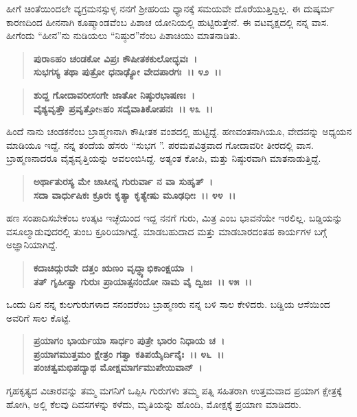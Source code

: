 ಹೀಗೆ ಚಿಂತೆಯಿಂದಲೇ ವ್ಯಗ್ರಮನಸ್ಸುಳ್ಳ ನನಗೆ ಶ‍್ರೀಹರಿಯ ಧ್ಯಾನಕ್ಕೆ ಸಮಯವೇ ದೊರೆಯುತ್ತಿದ್ದಿಲ್ಲ. ಈ ದುಷ್ಕರ್ಮ ಕಾರಣದಿಂದ ಹೀನನಾಗಿ ಕೂಷ್ಮಾಂಡವೆಂಬ ಪಿಶಾಚ ಯೋನಿಯಲ್ಲಿ ಹುಟ್ಟಿರುತ್ತೇನೆ. ಈ ವಟವೃಕ್ಷದಲ್ಲಿ ನನ್ನ ವಾಸ. ಹೀಗೆಂದು “ಹೀನ”ನು ನುಡಿಯಲು “ನಿಷ್ಠುರ”ನೆಂಬ ಪಿಶಾಚಿಯು ಮಾತನಾಡಿತು.

\begin{verse}
\textbf{ಪುರಾಽಹಂ ಚಂಡಕೋ ವಿಪ್ರಃ ಕೌಷೀತಕಕುಲೋದ್ಭವಃ~।}\\\textbf{ಸುಭಗಸ್ಯ ತಥಾ ಪುತ್ರೋ ಧನಾಢ್ಯೋ ವೇದಪಾರಗಃ~।। ೪೨~।। }
\end{verse}

\begin{verse}
\textbf{ಶುದ್ದ ಗೋದಾವರೀಸಂಗೇ ಜಾತೋ ನಿಷ್ಠುರಭಾಷಣಃ~।}\\\textbf{ವೈಶ್ಯವೃತ್ತೌ ಪ್ರವೃತ್ತೋsಹಂ ಸದೈವಾತಿಕೋಪನಃ~।। ೪೩~।।}
\end{verse}

ಹಿಂದೆ ನಾನು ಚಂಡಕನೆಂಬ ಬ್ರಾಹ್ಮಣನಾಗಿ ಕೌಷೀತಕ ವಂಶದಲ್ಲಿ ಹುಟ್ಟಿದ್ದೆ. ಹಣವಂತನಾಗಿಯೂ, ವೇದವನ್ನು ಅಧ್ಯಯನ ಮಾಡಿಯೂ ಇದ್ದೆ. ನನ್ನ ತಂದೆಯ ಹೆಸರು “ಸುಭಗ ”. ಪರಮಪವಿತ್ರವಾದ ಗೋದಾವರೀ ತೀರದಲ್ಲಿ ವಾಸ. ಬ್ರಾಹ್ಮಣನಾದರೂ ವೈಶ್ಯವೃತ್ತಿಯನ್ನು ಅವಲಂಬಿಸಿದ್ದೆ. ಅತ್ಯಂತ ಕೋಪಿ, ಮತ್ತು ನಿಷ್ಠುರವಾಗಿ ಮಾತನಾಡುತ್ತಿದ್ದೆ.

\begin{verse}
\textbf{ಅರ್ಥಾತುರಸ್ಯ ಮೇ ಚಾಸೀನ್ನ ಗುರುರ್ವಾ ನ ವಾ ಸುಹೃತ್~।}\\\textbf{ಸದಾ ವಾರ್ಧುಷಿಕಃ ಕ್ರೂರಃ ಕೃತ್ಯಾ ಕೃತ್ಯೇಷು ಮೂಢಧೀಃ~।। ೪೪~।।}
\end{verse}

ಹಣ ಸಂಪಾದಿಸಬೇಕೆಂಬ ಉತ್ಕಟ ಇಚ್ಛೆಯಿಂದ ಇದ್ದ ನನಗೆ ಗುರು, ಮಿತ್ರ ಎಂಬ ಭಾವನೆಯೇ ಇರಲಿಲ್ಲ. ಬಡ್ಡಿಯನ್ನು ವಸೂಲ್ಮಾಡುವುದರಲ್ಲಿ ತುಂಬ ಕ್ರೂರಿಯಾಗಿದ್ದೆ. ಮಾಡಬಹುದಾದ ಮತ್ತು ಮಾಡಬಾರದಂತಹ ಕಾರ್ಯಗಳ ಬಗ್ಗೆ ಅಜ್ಞಾನಿಯಾಗಿದ್ದೆ.

\begin{verse}
\textbf{ಕದಾಚಿದ್ಗುರವೇ ದತ್ತಂ ಋಣಂ ವೃದ್ಧ್ಯಾಭಿಕಾಂಕ್ಷಯಾ~।}\\\textbf{ತತ್ ಗೃಹೀತ್ವಾ ಗುರುಃ ಪ್ರಾಯಾತ್ಸನಂದೋ ನಾಮ ವೈ ದ್ವಿಜಃ~।। ೪೫~।।}
\end{verse}

ಒಂದು ದಿನ ನನ್ನ ಕುಲಗುರುಗಳಾದ ಸನಂದರೆಂಬ ಬ್ರಾಹ್ಮಣರು ನನ್ನ ಬಳಿ ಸಾಲ ಕೇಳಿದರು. ಬಡ್ಡಿಯ ಆಸೆಯಿಂದ ಅವರಿಗೆ ಸಾಲ ಕೊಟ್ಟೆ.

\begin{verse}
\textbf{ಪ್ರಯಾಗಂ ಭಾರ್ಯಯಾ ಸಾರ್ಧಂ ಪುತ್ರೇ ಭಾರಂ ನಿಧಾಯ ಚ~।}\\\textbf{ಪ್ರಯಾಗಮುತ್ತಮಂ ಕ್ಷೇತ್ರಂ ಗತ್ವಾ ಕತಿಪಯೈರ್ದಿನೈಃ~।। ೪೬~।। }\\\textbf{ಪಂಚತ್ವಮಭಿಪದ್ಯಾಥ ಮೋಕ್ಷಮಾರ್ಗಮುಪೇಯಿವಾನ್~।}
\end{verse}

ಗೃಹಕೃತ್ಯದ ವಿಚಾರವನ್ನು ತಮ್ಮ ಮಗನಿಗೆ ಒಪ್ಪಿಸಿ ಗುರುಗಳು ತಮ್ಮ ಪತ್ನಿ ಸಹಿತರಾಗಿ ಉತ್ತಮವಾದ ಪ್ರಯಾಗ ಕ್ಷೇತ್ರಕ್ಕೆ ಹೋಗಿ, ಅಲ್ಲಿ ಕೆಲವು ದಿವಸಗಳನ್ನು ಕಳೆದು, ಮೃತಿಯನ್ನು ಹೊಂದಿ, ಮೋಕ್ಷಕ್ಕೆ ಪ್ರಯಾಣ ಮಾಡಿದರು.

